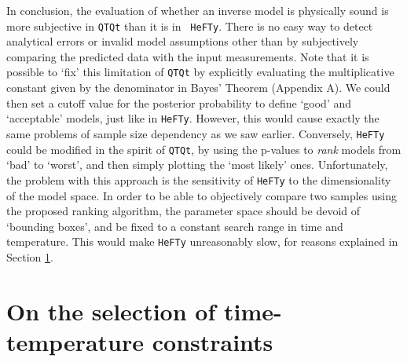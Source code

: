\documentclass{article}
\begin{document}
In conclusion, the evaluation of whether an inverse model is
physically sound is more subjective in {\tt QTQt} than it is in {\tt
  HeFTy}. There is no easy way to detect analytical errors or invalid
model assumptions other than by subjectively comparing the predicted
data with the input measurements.  Note that it is possible to `fix'
this limitation of {\tt QTQt} by explicitly evaluating the
multiplicative constant given by the denominator in Bayes' Theorem
(Appendix A). We could then set a cutoff value for the posterior
probability to define `good' and `acceptable' models, just like in
{\tt HeFTy}. However, this would cause exactly the same problems of
sample size dependency as we saw earlier.  Conversely, {\tt HeFTy}
could be modified in the spirit of {\tt QTQt}, by using the p-values
to {\it rank} models from `bad' to `worst', and then simply plotting
the `most likely' ones.  Unfortunately, the problem with this approach
is the sensitivity of {\tt HeFTy} to the dimensionality of the model
space. In order to be able to objectively compare two samples using
the proposed ranking algorithm, the parameter space should be devoid
of `bounding boxes', and be fixed to a constant search range in time
and temperature. This would make {\tt HeFTy} unreasonably slow, for
reasons explained in Section \ref{sec:boxes}.


\section{On the selection of time-temperature constraints}
\label{sec:boxes}
\end{document}
